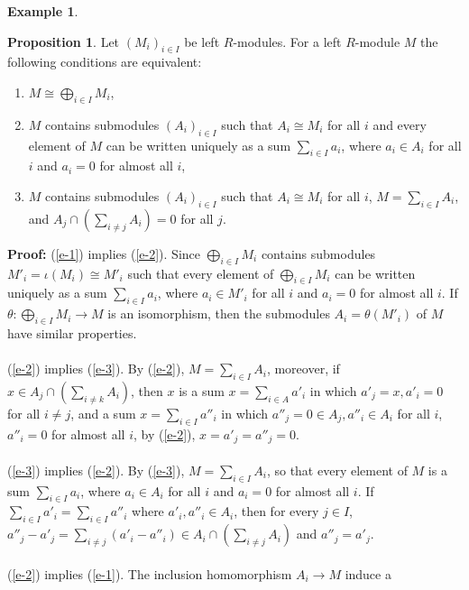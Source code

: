 \documentclass[11pt]{amsbook}%
\newcommand{\ii}{\item}
\theoremstyle{plain}
\theoremstyle{definition}
\newtheorem*{example*}{Example}
\newtheorem{proposition}[theorem]{Proposition}
\numberwithin{equation}{section}
\renewcommand{\proof}{ \textbf{Proof: }}
\begin{document}
\begin{example*}
\begin{proposition}
  \label{prop-equiv-sums}
  Let $(M_{i})_{i \in I}$ be left $R$-modules. For a left $R$-module $M$ the following conditions
  are equivalent:
  \begin{enumerate}[(1) ]
      \ii \label{e-1} $M \cong \bigoplus_{i \in I} M_{i}$,
      \ii \label{e-2} $M$ contains submodules $(A_{i})_{i \in I}$ such that $A_{i} \cong M_{i}$ for all $i$
      and every element of $M$ can be written uniquely as a sum $\sum_{i \in I} a_{i}$, where
      $a_{i} \in A_{i}$ for all $i$ and $a_{i} = 0$ for almost all $i$,
      \ii \label{e-3} $M$ contains submodules $(A_{i})_{i \in I}$ such that $A_{i} \cong M_{i}$ for all $i$,
      $M = \sum_{i \in I} A_{i}$, and $A_{j} \cap (\sum_{i \neq j} A_{i}) = 0$ for all $j$.
  \end{enumerate}
\end{proposition} \vspace{1.8em}
\proof (\ref{e-1}) implies (\ref{e-2}). Since $\bigoplus_{i \in I} M_{i}$ contains submodules
$M'_{i} = \iota(M_{i}) \cong M'_{i}$ such that every element of $\bigoplus_{i \in I} M_{i}$ can
be written uniquely as a sum $\sum_{i \in I} a_{i}$, where $a_{i} \in M'_{i}$ for all $i$
and $a_{i} = 0$ for almost all $i$. If $\theta: \bigoplus_{i \in I} M_{i} \longrightarrow M$
is an isomorphism, then the submodules $A_{i} = \theta(M'_{i})$ of $M$
have similar properties. \\ \\
(\ref{e-2}) implies (\ref{e-3}). By (\ref{e-2}), $M = \sum_{i \in I} A_{i}$, moreover, 
if $x \in A_{j} \cap (\sum_{i \neq k} A_{i})$, then $x$ is a sum $x = \sum_{i \in A} a'_{i}$
in which $a'_{j} = x, a'_{i} = 0$ for all $i \neq j$, and a sum $x = \sum_{i \in I} a''_{i}$
in which $a''_{j} = 0 \in A_{j}, a''_{i} \in A_{i}$ for all $i$, $a''_{i} = 0$ for almost all $i$,
by (\ref{e-2}), $x = a'_{j} = a''_{j} = 0$. \\ \\
(\ref{e-3}) implies (\ref{e-2}). By (\ref{e-3}), $M = \sum_{i \in I} A_{i}$, so that every
element of $M$ is a sum $\sum_{i \in I} a_{i}$, where $a_{i} \in A_{i}$ for all $i$
and $a_{i} = 0$ for almost all $i$. If $\sum_{i \in I} a'_{i} = \sum_{i \in I} a''_{i}$ where
$a'_{i}, a''_{i} \in A_{i}$, then for every $j \in I$, $a''_{j} - a'_{j} = \sum_{i \neq j} (a'_{i} - a''_{i}) \in A_{i} \cap (\sum_{i \neq j} A_{i})$
and $a''_{j} = a'_{j}$. \\ \\
(\ref{e-2}) implies (\ref{e-1}). The inclusion homomorphism $A_{i} \longrightarrow M$ induce a

\end{example*}
\end{document}
